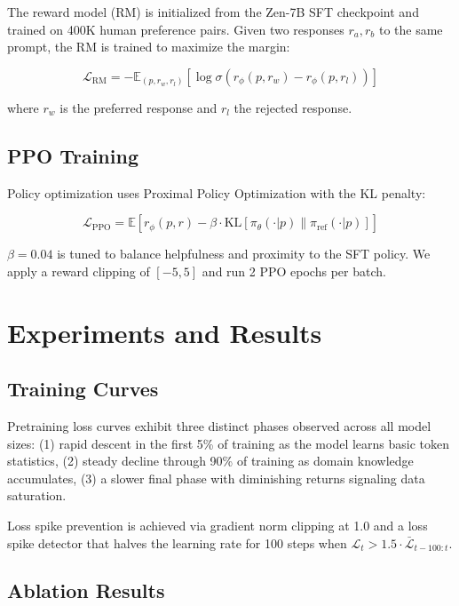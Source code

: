\documentclass[11pt,a4paper]{article}
\begin{document}
The reward model (RM) is initialized from the Zen-7B SFT checkpoint and trained on
400K human preference pairs. Given two responses $r_a, r_b$ to the same prompt,
the RM is trained to maximize the margin:

\begin{equation}
\mathcal{L}_\text{RM} = -\mathbb{E}_{(p,r_w,r_l)} \left[\log \sigma\left(r_\phi(p, r_w) - r_\phi(p, r_l)\right)\right]
\end{equation}

where $r_w$ is the preferred response and $r_l$ the rejected response.

\subsection{PPO Training}

Policy optimization uses Proximal Policy Optimization with the KL penalty:

\begin{equation}
\mathcal{L}_\text{PPO} = \mathbb{E}\left[r_\phi(p, r) - \beta \cdot \text{KL}\left[\pi_\theta(\cdot|p) \| \pi_{\text{ref}}(\cdot|p)\right]\right]
\end{equation}

$\beta = 0.04$ is tuned to balance helpfulness and proximity to the SFT policy.
We apply a reward clipping of $[-5, 5]$ and run 2 PPO epochs per batch.

\section{Experiments and Results}

\subsection{Training Curves}

Pretraining loss curves exhibit three distinct phases observed across all model sizes:
(1) rapid descent in the first 5\% of training as the model learns basic token statistics,
(2) steady decline through 90\% of training as domain knowledge accumulates,
(3) a slower final phase with diminishing returns signaling data saturation.

Loss spike prevention is achieved via gradient norm clipping at 1.0 and a loss
spike detector that halves the learning rate for 100 steps when $\mathcal{L}_t > 1.5 \cdot \bar{\mathcal{L}}_{t-100:t}$.

\subsection{Ablation Results}
\end{document}

